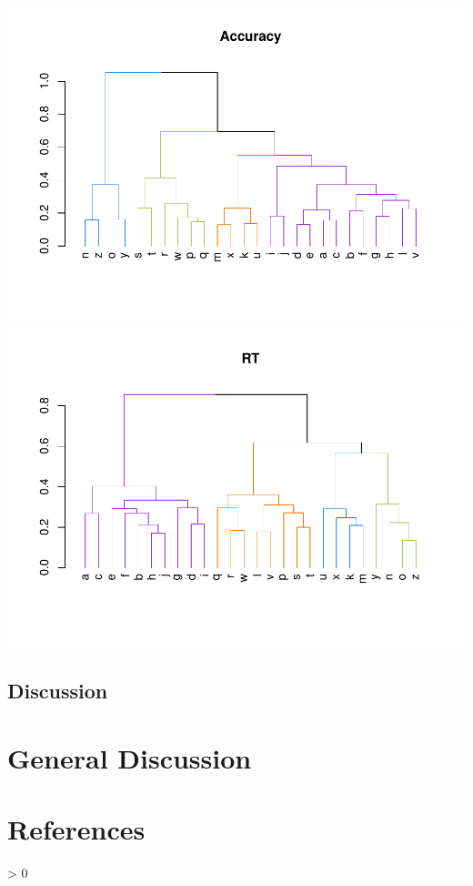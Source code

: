 \documentclass[
  english,
  man]{apa7}
\newlength{\cslhangindent}
\newenvironment{CSLReferences}[2] %
 {%
  \setlength{\parindent}{0pt}
  \ifodd #1 \everypar{\setlength{\hangindent}{\cslhangindent}}\ignorespaces\fi
  \ifnum #2 > 0
  \setlength{\parskip}{#2\baselineskip}
  \fi
 }%
 {}
\begin{document}
\includegraphics{BF_ms_1_files/figure-latex/Dendrograms with color bl-1.pdf} \includegraphics{BF_ms_1_files/figure-latex/Dendrograms with color bl-2.pdf}

\hypertarget{discussion-1}{%
\subsection{Discussion}\label{discussion-1}}

\hypertarget{general-discussion}{%
\section{General Discussion}\label{general-discussion}}

\newpage

\hypertarget{references}{%
\section{References}\label{references}}

\begingroup
\setlength{\parindent}{-0.5in}
\setlength{\leftskip}{0.5in}

\hypertarget{refs}{}
\begin{CSLReferences}{0}{0}
\end{CSLReferences}

\endgroup
\end{document}
